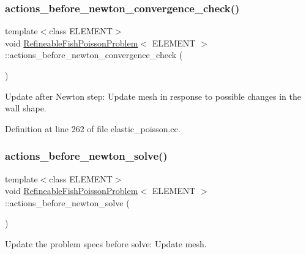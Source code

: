 \subsubsection{\texorpdfstring{actions\+\_\+before\+\_\+newton\+\_\+convergence\+\_\+check()}{actions\_before\_newton\_convergence\_check()}}
{\footnotesize\ttfamily template$<$class E\+L\+E\+M\+E\+NT$>$ \\
void \hyperlink{classRefineableFishPoissonProblem}{Refineable\+Fish\+Poisson\+Problem}$<$ E\+L\+E\+M\+E\+NT $>$\+::actions\+\_\+before\+\_\+newton\+\_\+convergence\+\_\+check (\begin{DoxyParamCaption}{ }\end{DoxyParamCaption})\hspace{0.3cm}{\ttfamily [inline]}}



Update after Newton step\+: Update mesh in response to possible changes in the wall shape. 



Definition at line 262 of file elastic\+\_\+poisson.\+cc.

\mbox{\label{classRefineableFishPoissonProblem_a58098181f3b88c2fc65f24fb15c1a529}} 
\subsubsection{\texorpdfstring{actions\+\_\+before\+\_\+newton\+\_\+solve()}{actions\_before\_newton\_solve()}}
{\footnotesize\ttfamily template$<$class E\+L\+E\+M\+E\+NT$>$ \\
void \hyperlink{classRefineableFishPoissonProblem}{Refineable\+Fish\+Poisson\+Problem}$<$ E\+L\+E\+M\+E\+NT $>$\+::actions\+\_\+before\+\_\+newton\+\_\+solve (\begin{DoxyParamCaption}{ }\end{DoxyParamCaption})\hspace{0.3cm}{\ttfamily [inline]}}



Update the problem specs before solve\+: Update mesh. 




